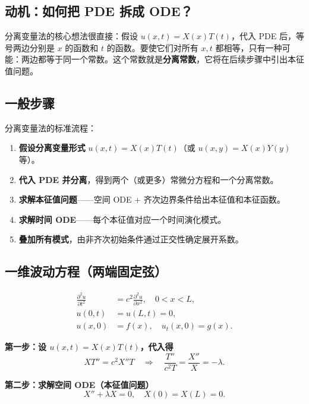 \subsection*{动机：如何把 PDE 拆成 ODE？}

分离变量法的核心想法很直接：假设 $u(x,t)=X(x)T(t)$，代入 PDE 后，等号两边分别是 $x$ 的函数和 $t$ 的函数。要使它们对所有 $x,t$ 都相等，只有一种可能：两边都等于同一个常数。这个常数就是\textbf{分离常数}，它将在后续步骤中引出本征值问题。

\subsection{一般步骤}

分离变量法的标准流程：

\begin{enumerate}
\item \textbf{假设分离变量形式} $u(x,t) = X(x)T(t)$（或 $u(x,y) = X(x)Y(y)$ 等）。
\item \textbf{代入 PDE 并分离}，得到两个（或更多）常微分方程和一个分离常数。
\item \textbf{求解本征值问题}——空间 ODE + 齐次边界条件给出本征值和本征函数。
\item \textbf{求解时间 ODE}——每个本征值对应一个时间演化模式。
\item \textbf{叠加所有模式}，由非齐次初始条件通过正交性确定展开系数。
\end{enumerate}

\subsection{一维波动方程（两端固定弦）}

\begin{align}
\frac{\partial^2 u}{\partial t^2} &= c^2 \frac{\partial^2 u}{\partial x^2},\quad
0<x<L,\\
u(0,t) &= u(L,t) = 0,\\
u(x,0) &= f(x),\quad u_t(x,0) = g(x).
\end{align}

\textbf{第一步：设 $u(x,t) = X(x)T(t)$，代入得}
\begin{equation}
X T'' = c^2 X'' T \quad\Longrightarrow\quad
\frac{T''}{c^2 T} = \frac{X''}{X} = -\lambda.
\end{equation}

\textbf{第二步：求解空间 ODE（本征值问题）}
\begin{equation}
X'' + \lambda X = 0,\quad X(0)=X(L)=0.
\end{equation}

